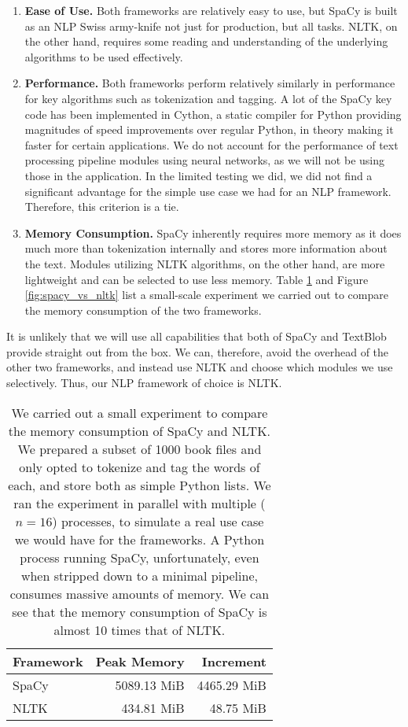 \begin{enumerate}
    \item \textbf{Ease of Use.} Both frameworks are relatively easy to use, but SpaCy is built as an NLP Swiss army-knife not just for production, but all tasks. NLTK, on the other hand, requires some reading and understanding of the underlying algorithms to be used effectively.
    \item \textbf{Performance.} Both frameworks perform relatively similarly in performance for key algorithms such as tokenization and tagging. A lot of the SpaCy key code has been implemented in Cython, a static compiler for Python providing magnitudes of speed improvements over regular Python, in theory making it faster for certain applications. We do not account for the performance of text processing pipeline modules using neural networks, as we will not be using those in the application. In the limited testing we did, we did not find a significant advantage for the simple use case we had for an NLP framework. Therefore, this criterion is a tie. 
    \item \textbf{Memory Consumption.} SpaCy inherently requires more memory as it does much more than tokenization internally and stores more information about the text. Modules utilizing NLTK algorithms, on the other hand, are more lightweight and can be selected to use less memory. Table \ref{tab:spacy_vs_nltk} and Figure \ref{fig:spacy_vs_nltk} list a small-scale experiment we carried out to compare the memory consumption of the two frameworks.
\end{enumerate}

It is unlikely that we will use all capabilities that both of SpaCy and TextBlob provide straight out from the box. We can, therefore, avoid the overhead of the other two frameworks, and instead use NLTK and choose which modules we use selectively. Thus, our NLP framework of choice is NLTK.

\begin{table}[htbp]
    \centering
        \begin{tabular}{lrr}
            \toprule
            Framework  &  Peak Memory  &     Increment \\
            \midrule
                SpaCy  &  5089.13 MiB  &   4465.29 MiB \\
                NLTK &  434.81 MiB   &     48.75 MiB \\
            \bottomrule
            \end{tabular}
    \caption{We carried out a small experiment to compare the memory consumption of SpaCy and NLTK. We prepared a subset of 1000 book files and only opted to tokenize and tag the words of each, and store both as simple Python lists. We ran the experiment in parallel with multiple ($n=16$) processes, to simulate a real use case we would have for the frameworks. A Python process running SpaCy, unfortunately, even when stripped down to a minimal pipeline, consumes massive amounts of memory. We can see that the memory consumption of SpaCy is almost 10 times that of NLTK. }
    \label{tab:spacy_vs_nltk}
\end{table}

